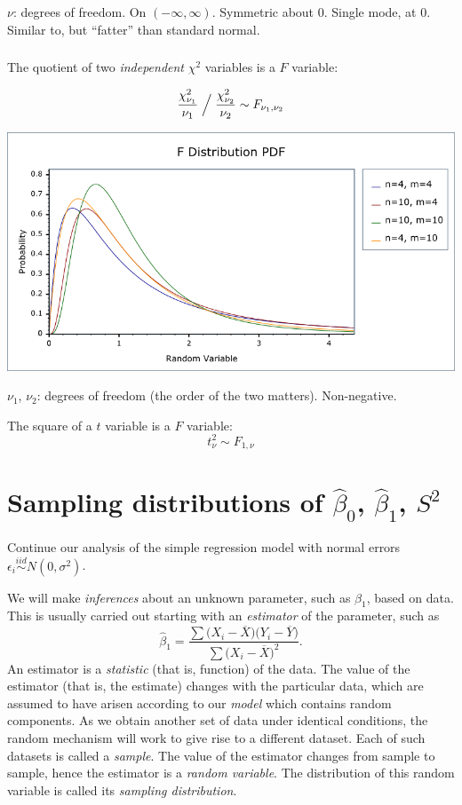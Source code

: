 \documentclass[12pt]{article}
\begin{document}
$\nu$: degrees of freedom.
On $(-\infty, \infty)$. Symmetric about 0.
Single mode, at 0.
Similar to, but ``fatter'' than standard normal.

\subsubsection{}

The quotient of two \emph{independent} $\chi^2$ variables
is a $F$ variable:

\parbox{.40\textwidth}{%
\[
\frac{\chi^2_{\nu_1}}{\nu_1} \Bigm/
    \frac{\chi^2_{\nu_2}}{\nu_2}
\sim
F_{\nu_1, \nu_2}
\]
}\parbox{.59\textwidth}{%
\includegraphics[width=.58\textwidth]{fig_F.png}
}

$\nu_1$, $\nu_2$: degrees of freedom (the order of the two matters).
Non-negative.

The square of a $t$ variable is a $F$ variable:
\[
t_\nu^2 \sim F_{1,\nu}
\]

\newpage

\section{Sampling distributions of $\hat{\beta}_0$, $\hat{\beta}_1$, $S^2$}

Continue our analysis of the simple regression model with normal errors
$\epsilon_i \overset{iid}{\sim} N(0, \sigma^2)$.

We will make \emph{inferences} about an unknown parameter,
such as $\beta_1$, based on data.
This is usually carried out starting with an \emph{estimator} of the
parameter,
such as
\[
\hat{\beta}_1
= \frac{\sum \bigl(X_i - \overline{X}\bigr)\bigl(Y_i - \overline{Y}\bigr)}
        {\sum \bigl(X_i - \overline{X}\bigr)^2}
.
\]
An estimator is a \emph{statistic} (that is, function) of the data.
The value of the estimator (that is, the estimate) changes with the
particular data, which are assumed to have arisen
according to our \emph{model} which contains random components.
As we obtain another set of data under identical conditions,
the random mechanism will work to give rise to a different dataset.
Each of such datasets is called a \emph{sample}.
The value of the estimator changes from sample to sample,
hence the estimator is a \emph{random variable}.
The distribution of this random variable is
called its \emph{sampling distribution}.
\end{document}
